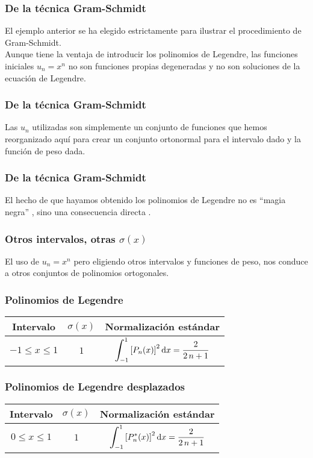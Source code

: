 \documentclass[12pt]{beamer}
\begin{document}
\begin{frame}
\frametitle{De la técnica Gram-Schmidt}
El ejemplo anterior se ha elegido estrictamente para ilustrar el procedimiento de Gram-Schmidt.
\\
\bigskip
\pause
Aunque tiene la ventaja de introducir los polinomios de Legendre, las funciones iniciales $u_{n} = x^{n}$ no son funciones propias degeneradas y no son soluciones de la ecuación de Legendre.
\end{frame}
\begin{frame}
\frametitle{De la técnica Gram-Schmidt}  
Las $u_{n}$ utilizadas son simplemente un conjunto de funciones que hemos reorganizado aquí para crear un conjunto ortonormal para el intervalo dado y la función de peso dada.
\end{frame}
\begin{frame}
\frametitle{De la técnica Gram-Schmidt}  
El hecho de que hayamos obtenido los polinomios de Legendre no es \enquote{magia negra} , sino una consecuencia directa .
\end{frame}
\begin{frame}
\frametitle{Otros intervalos, otras $\sigma (x)$}  
El uso de $u_{n} = x^{n}$ pero eligiendo otros intervalos y funciones de peso, nos conduce a otros conjuntos de polinomios ortogonales. 
\end{frame}
\begin{frame}
\frametitle{Polinomios de Legendre}
\begingroup
\renewcommand{\arraystretch}{2.5}
\begin{table}
\begin{tabular}{c c c}
Intervalo & $\sigma (x)$ & Normalización estándar \\ \hline
$-1 \leq x \leq 1$ & $1$ & $\displaystyle \scaleint{6ex}_{\bs -1}^{1} \left[ P_{n} (x) \right]^{2} \dd{x} = \dfrac{2}{2 \, n + 1} $
\end{tabular}
\end{table}
\endgroup
\end{frame}
\begin{frame}
\frametitle{Polinomios de Legendre desplazados}
\begingroup
\renewcommand{\arraystretch}{2.5}
\begin{table}
\begin{tabular}{c c c}
Intervalo & $\sigma (x)$ & Normalización estándar \\ \hline
$0 \leq x \leq 1$ & $1$ & $\displaystyle \scaleint{6ex}_{\bs -1}^{1} \left[ P_{n}^{*}(x) \right]^{2} \dd{x} = \dfrac{2}{2 \, n + 1}$  
\end{tabular}
\end{table}
\endgroup
\end{frame}
\end{document}
